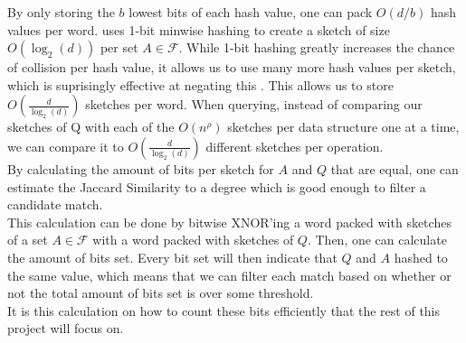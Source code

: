 By only storing the $b$ lowest bits of each hash value, one can pack $O(d/b)$ hash values per word. \citet{fast-similarity-search} uses 1-bit minwise hashing to create a sketch of size $O(\log_2(d))$ per set $A\in \mathcal{F}$.
While 1-bit hashing greatly increases the chance of collision per hash value, it allows us to use many more hash values per sketch, which is suprisingly effective at negating this \cite{li2011hashing}.
This allows us to store $O(\frac{d}{\log_2(d)})$ sketches per word. When querying, instead of comparing our sketches of Q with each of the $O(n^\rho)$ sketches per data structure one at a time, we can compare it to $O(\frac{d}{\log_2(d)})$ different sketches per operation. \\
By calculating the amount of bits per sketch for $A$ and $Q$ that are equal, one can estimate the Jaccard Similarity to a degree which is good enough to filter a candidate match.\\
This calculation can be done by bitwise XNOR'ing a word packed with sketches of a set $A\in \mathcal{F}$ with a word packed with sketches of $Q$. Then, one can calculate the amount of bits set. Every bit set will then indicate that $Q$ and $A$ hashed to the same value, which means that we can filter each match based on whether or not the total amount of bits set is over some threshold.\\
It is this calculation on how to count these bits efficiently that the rest of this project will focus on.
